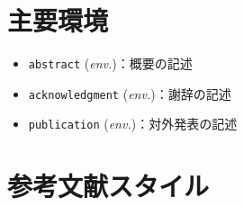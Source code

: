 \documentclass{ltjsarticle}
\newcommand{\pkg}[1]{\texttt{#1}}
\begin{document}
\section{主要環境}
\begin{itemize}
    \item \pkg{abstract} (\textit{env.})：概要の記述
    \item \pkg{acknowledgment} (\textit{env.})：謝辞の記述
    \item \pkg{publication} (\textit{env.})：対外発表の記述
\end{itemize}
\section{参考文献スタイル}
\end{document}

